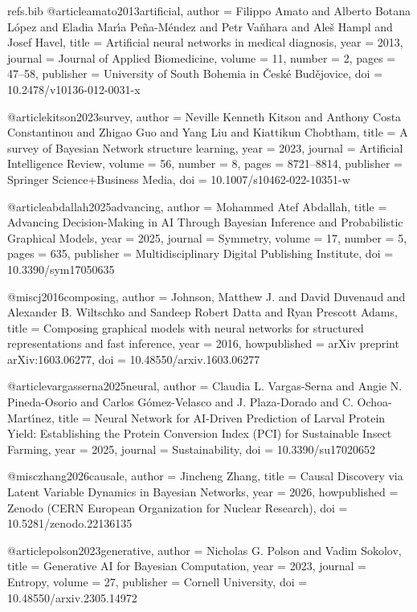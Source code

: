 \begin{filecontents*}[overwrite]{refs.bib}
@article{amato2013artificial,
  author = {Filippo Amato and Alberto Botana L{\'o}pez and Eladia Mar{\'\i}a Pe{\~n}a{-}M{\'e}ndez and Petr Va{\v{n}}hara and Ale{\v{s}} Hampl and Josef Havel},
  title = {{Artificial neural networks in medical diagnosis}},
  year = {2013},
  journal = {Journal of Applied Biomedicine},
  volume = {11},
  number = {2},
  pages = {47--58},
  publisher = {University of South Bohemia in {\v{C}}esk{\'e} Bud{\v{e}}jovice},
  doi = {10.2478/v10136-012-0031-x}
}

@article{kitson2023survey,
  author = {Neville  Kenneth Kitson and Anthony Costa Constantinou and Zhigao Guo and Yang Liu and Kiattikun Chobtham},
  title = {{A survey of Bayesian Network structure learning}},
  year = {2023},
  journal = {Artificial Intelligence Review},
  volume = {56},
  number = {8},
  pages = {8721--8814},
  publisher = {Springer Science+Business Media},
  doi = {10.1007/s10462-022-10351-w}
}

@article{abdallah2025advancing,
  author = {Mohammed Atef Abdallah},
  title = {{Advancing Decision-Making in AI Through Bayesian Inference and Probabilistic Graphical Models}},
  year = {2025},
  journal = {Symmetry},
  volume = {17},
  number = {5},
  pages = {635},
  publisher = {Multidisciplinary Digital Publishing Institute},
  doi = {10.3390/sym17050635}
}

@misc{j2016composing,
  author = {Johnson, Matthew J. and David Duvenaud and Alexander B. Wiltschko and Sandeep Robert Datta and Ryan Prescott Adams},
  title = {{Composing graphical models with neural networks for structured representations and fast inference}},
  year = {2016},
  howpublished = {arXiv preprint arXiv:1603.06277},
  doi = {10.48550/arxiv.1603.06277}
}

@article{vargasserna2025neural,
  author = {Claudia L. Vargas-Serna and Angie N. Pineda-Osorio and Carlos G{\'o}mez-Velasco and J. Plaza-Dorado and C. Ochoa-Mart{\'\i}nez},
  title = {{Neural Network for AI-Driven Prediction of Larval Protein Yield: Establishing the Protein Conversion Index (PCI) for Sustainable Insect Farming}},
  year = {2025},
  journal = {Sustainability},
  doi = {10.3390/su17020652}
}

@misc{zhang2026causale,
  author = {Jincheng Zhang},
  title = {{Causal Discovery via Latent Variable Dynamics in Bayesian Networks}},
  year = {2026},
  howpublished = {Zenodo (CERN European Organization for Nuclear Research)},
  doi = {10.5281/zenodo.22136135}
}

@article{polson2023generative,
  author = {Nicholas G. Polson and Vadim Sokolov},
  title = {{Generative AI for Bayesian Computation}},
  year = {2023},
  journal = {Entropy},
  volume = {27},
  publisher = {Cornell University},
  doi = {10.48550/arxiv.2305.14972}
}


\end{filecontents*}
